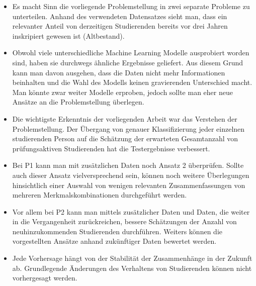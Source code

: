 \begin{itemize}
    \item Es macht Sinn die vorliegende Problemstellung in zwei separate Probleme zu unterteilen. Anhand des verwendeten Datensatzes sieht man, dass
          ein relevanter Anteil von derzeitigen Studierenden bereits vor drei Jahren inskripiert gewesen ist (Altbestand).

    \item Obwohl viele unterschiedliche Machine Learning Modelle ausprobiert worden sind, haben sie durchwegs \"ahnliche Ergebnisse geliefert.
          Aus diesem Grund kann man davon ausgehen, dass die Daten nicht mehr Informationen beinhalten und die Wahl des Modells keinen gravierenden Unterschied macht.
          Man k\"onnte zwar weiter Modelle erproben, jedoch sollte man eher neue Ans\"atze an die Problemstellung \"uberlegen.

    \item Die wichtigste Erkenntnis der vorliegenden Arbeit war das Verstehen der Problemstellung. Der \"Ubergang von genauer Klassifizierung jeder einzelnen
          studierenden Person auf die Sch\"atzung der erwarteten Gesamtanzahl von pr\"ufungsaktiven Studierenden hat die Testergebnisse verbessert.

    \item Bei P1 kann man mit zus\"atzlichen Daten noch Ansatz 2 \"uberpr\"ufen. Sollte auch dieser Ansatz vielversprechend sein, k\"onnen noch weitere
          \"Uberlegungen hinsichtlich einer Auswahl von wenigen relevanten Zusammenfassungen von mehreren Merkmalskombinationen durchgef\"uhrt werden.

    \item Vor allem bei P2 kann man mittels zus\"atzlicher Daten und Daten, die weiter in die Vergangenheit zur\"uckreichen, bessere Sch\"atzungen der
          Anzahl von neuhinzukommenden Studierenden durchf\"uhren. Weiters k\"onnen die vorgestellten Ans\"atze anhand zuk\"unftiger Daten bewertet werden.

    \item Jede Vorhersage h\"angt von der Stabilit\"at der Zusammenh\"ange in der Zukunft ab. Grundlegende \"Anderungen des Verhaltens von Studierenden
          k\"onnen nicht vorhergesagt werden.


\end{itemize}